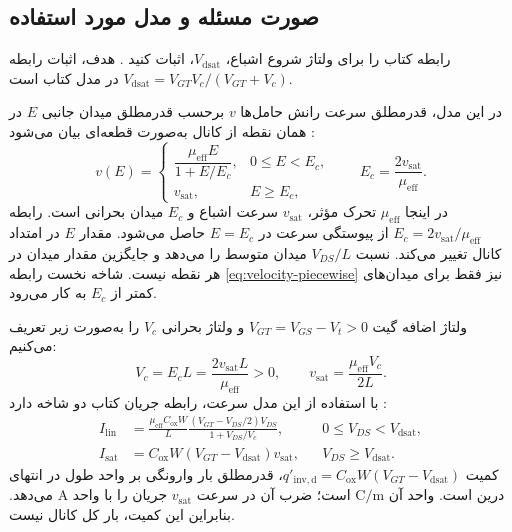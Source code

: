 \subsection*{صورت مسئله و مدل مورد استفاده}
رابطه  کتاب را برای ولتاژ شروع اشباع، \(V_{\mathrm{dsat}}\)، اثبات کنید
\cite[تمرین ، صفحه چاپی ۹۶]{weste}.
هدف، اثبات رابطه
\(V_{\mathrm{dsat}}=V_{GT}V_c/(V_{GT}+V_c)\)
در مدل  کتاب است.

در این مدل، قدرمطلق سرعت رانش حامل‌ها \(v\) برحسب قدرمطلق میدان جانبی \(E\) در همان نقطه از کانال به‌صورت قطعه‌ای بیان می‌شود
\cite[روابط  و ، صفحه چاپی ۷۶]{weste}\cite[اسلاید ۹]{nonideal}:
\begin{equation}
 v(E)=
 \begin{cases}
 \dfrac{\mu_{\mathrm{eff}}E}{1+E/E_c},&0\le E<E_c,\\[4pt]
 v_{\mathrm{sat}},&E\ge E_c,
 \end{cases}
 \qquad E_c=\frac{2v_{\mathrm{sat}}}{\mu_{\mathrm{eff}}}.
 \label{eq:velocity-piecewise}
\end{equation}
در اینجا \(\mu_{\mathrm{eff}}\) تحرک مؤثر، \(v_{\mathrm{sat}}\) سرعت اشباع و \(E_c\) میدان بحرانی است.
رابطه \(E_c=2v_{\mathrm{sat}}/\mu_{\mathrm{eff}}\) از پیوستگی سرعت در \(E=E_c\) حاصل می‌شود.
مقدار \(E\) در امتداد کانال تغییر می‌کند. نسبت \(V_{DS}/L\) میدان متوسط را می‌دهد و جایگزین مقدار میدان در هر نقطه نیست.
شاخه نخست رابطه \eqref{eq:velocity-piecewise} نیز فقط برای میدان‌های کمتر از \(E_c\) به کار می‌رود.

ولتاژ اضافه گیت \(V_{GT}=V_{GS}-V_t>0\) و ولتاژ بحرانی \(V_c\) را به‌صورت زیر تعریف می‌کنیم:
\begin{equation}
 V_c=E_cL=\frac{2v_{\mathrm{sat}}L}{\mu_{\mathrm{eff}}}>0,
 \qquad v_{\mathrm{sat}}=\frac{\mu_{\mathrm{eff}}V_c}{2L}.
 \label{eq:velocity-critical-voltage}
\end{equation}
با استفاده از این مدل سرعت، رابطه جریان کتاب دو شاخه دارد
\cite[رابطه ، صفحه چاپی ۷۷]{weste}:
\begin{align}
 I_{\mathrm{lin}}&=\frac{\mu_{\mathrm{eff}}C_{\mathrm{ox}}W}{L}
 \frac{(V_{GT}-V_{DS}/2)V_{DS}}{1+V_{DS}/V_c},
 &&0\le V_{DS}<V_{\mathrm{dsat}},
 \label{eq:velocity-linear}\\
 I_{\mathrm{sat}}&=C_{\mathrm{ox}}W(V_{GT}-V_{\mathrm{dsat}})v_{\mathrm{sat}},
 &&V_{DS}\ge V_{\mathrm{dsat}}.
 \label{eq:velocity-saturation}
\end{align}
کمیت \(q'_{\mathrm{inv,d}}=C_{\mathrm{ox}}W(V_{GT}-V_{\mathrm{dsat}})\)، قدرمطلق بار وارونگی بر واحد طول در انتهای درین است.
واحد آن \(\unit{\coulomb\per\metre}\) است؛ ضرب آن در سرعت \(v_{\mathrm{sat}}\) جریان را با واحد \(\unit{\ampere}\) می‌دهد.
بنابراین این کمیت، بار کل کانال نیست.

